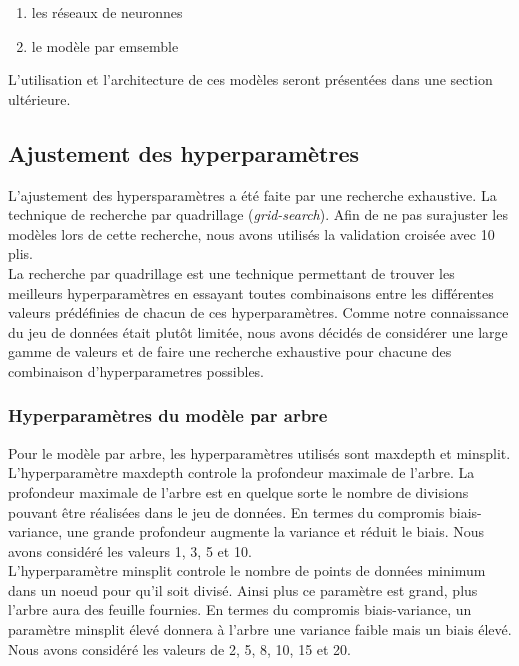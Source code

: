 \begin{enumerate}
  \item les réseaux de neuronnes
  \item le modèle par emsemble
\end{enumerate}

L'utilisation et l'architecture de ces modèles seront présentées dans une section ultérieure.

\subsection{Ajustement des hyperparamètres}
L'ajustement des hypersparamètres a été faite par une recherche exhaustive. La technique de recherche par quadrillage (\textit{grid-search}). Afin de ne pas surajuster les modèles lors de cette recherche, nous avons utilisés la validation croisée avec 10 plis.\\
La recherche par quadrillage est une technique permettant de trouver les meilleurs hyperparamètres en essayant toutes combinaisons entre les différentes valeurs prédéfinies de chacun de ces hyperparamètres. Comme notre connaissance du jeu de données était plutôt limitée, nous avons décidés de considérer une large gamme de valeurs et de faire une recherche exhaustive pour chacune des combinaison d'hyperparametres possibles.

\subsubsection{Hyperparamètres du modèle par arbre}
Pour le modèle par arbre, les hyperparamètres utilisés sont maxdepth et minsplit. \\
L'hyperparamètre maxdepth controle la profondeur maximale de l'arbre. La profondeur maximale de l'arbre est en quelque sorte le nombre de divisions pouvant être réalisées dans le jeu de données. En termes du compromis biais-variance, une grande profondeur augmente la variance et réduit le biais. Nous avons considéré les valeurs 1, 3, 5 et 10.\\
L'hyperparamètre minsplit controle le nombre de points de données minimum dans un noeud pour qu'il soit divisé. Ainsi plus ce paramètre est grand, plus l'arbre aura des feuille fournies. En termes du compromis biais-variance, un paramètre minsplit élevé donnera à l'arbre une variance faible mais un biais élevé. Nous avons considéré les valeurs de 2, 5, 8, 10, 15 et 20.

